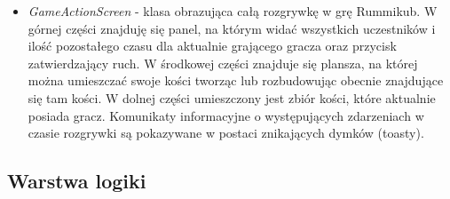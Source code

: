 \begin{itemize}
	\item \emph{GameActionScreen} - klasa obrazująca całą rozgrywkę w grę Rummikub. W górnej części znajduję się panel, na którym widać wszystkich uczestników i ilość pozostałego czasu dla aktualnie grającego gracza oraz przycisk zatwierdzający ruch. W środkowej części znajduje się plansza, na której można umieszczać swoje kości tworząc lub rozbudowując obecnie znajdujące się tam kości. W dolnej części umieszczony jest zbiór kości, które aktualnie posiada gracz. Komunikaty informacyjne o występujących zdarzeniach w czasie rozgrywki są pokazywane w postaci znikających dymków (toasty).
\end{itemize}

\subsection{Warstwa logiki}

